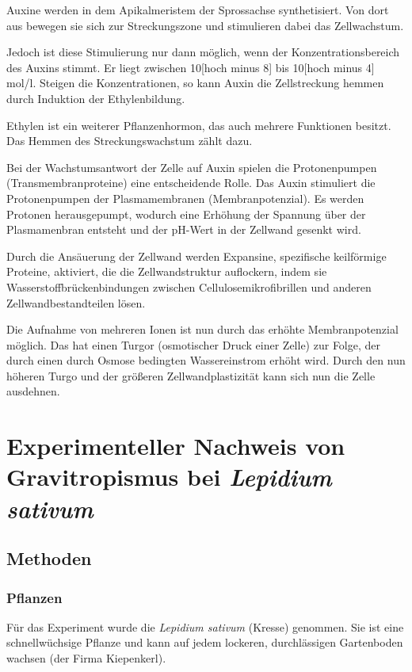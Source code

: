 \documentclass[
a4paper, 
11pt, 
ngerman,
listof=totoc,
bibliography=totocnumbered,
abstracton
]{scrreprt}
\begin{document}
Auxine werden in dem Apikalmeristem der Sprossachse synthetisiert. Von dort aus bewegen sie sich zur Streckungszone und stimulieren dabei das Zellwachstum.

Jedoch ist diese Stimulierung nur dann möglich, wenn der Konzentrationsbereich des Auxins stimmt. Er liegt zwischen 10[hoch minus 8] bis 10[hoch minus 4] mol/l. Steigen die Konzentrationen, so kann Auxin die Zellstreckung hemmen durch Induktion der Ethylenbildung.

Ethylen ist ein weiterer Pflanzenhormon, das auch mehrere Funktionen besitzt. Das Hemmen des Streckungswachstum zählt dazu. 

Bei der Wachstumsantwort der Zelle auf Auxin spielen die Protonenpumpen (Transmembranproteine) eine entscheidende Rolle. Das Auxin stimuliert die Protonenpumpen der Plasmamembranen (Membranpotenzial). Es werden Protonen herausgepumpt, wodurch eine Erhöhung der Spannung über der Plasmamenbran entsteht und der pH-Wert in der Zellwand gesenkt wird. 

Durch die Ansäuerung  der Zellwand werden Expansine, spezifische keilförmige Proteine, aktiviert, die die Zellwandstruktur auflockern, indem sie Wasserstoffbrückenbindungen zwischen Cellulosemikrofibrillen und anderen Zellwandbestandteilen lösen. 

Die Aufnahme von mehreren Ionen ist nun durch das erhöhte Membranpotenzial möglich. Das hat einen Turgor (osmotischer Druck einer Zelle) zur Folge, der durch einen durch Osmose bedingten Wassereinstrom erhöht wird. Durch den nun höheren Turgo und der größeren Zellwandplastizität kann sich nun die Zelle ausdehnen.




\chapter{Experimenteller Nachweis von Gravitropismus bei \emph{Lepidium sativum}}

\section{Methoden}

\subsection{Pflanzen}

Für das Experiment wurde die \emph{Lepidium sativum} (Kresse) genommen. Sie ist eine schnellwüchsige Pflanze und kann auf jedem lockeren, durchlässigen Gartenboden wachsen (der Firma Kiepenkerl).
\end{document}
